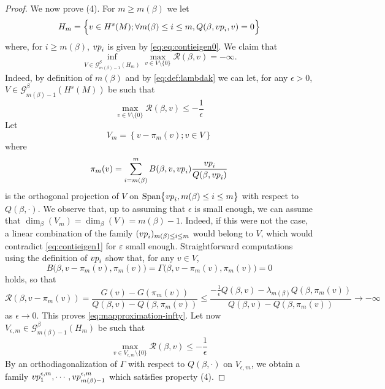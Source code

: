 \documentclass[10pt,a4paper]{amsart}
\def\ep{{\varepsilon}}
\newcommand{\vp}{{\rm vp}}
\begin{document}
\begin{proof}
We now prove (4). For $m \geq m(\beta)$ we let
$$ H_m = \Big \{ v \in H^s(M) ; \forall m(\beta)\leq i \leq m,  Q(\beta,\vp_i,v) = 0  \Big \} $$
where, for $i \ge m(\beta)$, $\vp_i$ is given by \eqref{eq:eq:contieigen0}. We claim that
\begin{equation} \label{eq:mapproximation-infty} \inf_{V \in \mathcal{G}^\beta_{m(\beta)-1}(H_m)} \max_{v\in V\setminus \{0\}} \mathcal{R}(\beta,v) = -\infty .\end{equation}
Indeed, by definition of $m(\beta)$ and by \eqref{eq:def:lambdak} we can let, for any $\epsilon >0$, $V \in \mathcal{G}_{m(\beta)-1}^\beta(H^s(M))$ be such that 
\begin{equation} \label{eq:contieigen1}
 \max_{v\in V\setminus\{0\}} \mathcal{R}(\beta,v) \leq -\frac{1}{\epsilon} 
 \end{equation}
Let
$$ V_m = \left\{ v - \pi_m(v) ; v\in V \right\} $$
where
$$\pi_m(v) = \sum_{i=m(\beta)}^m B(\beta,v,\vp_i) \frac{\vp_i}{Q(\beta,\vp_i)} $$
is the orthogonal projection of $V$ on $ \text{Span} \big \{ \vp_i, m(\beta)\leq i \leq m \big \} $ with respect to $Q(\beta,\cdot)$. We observe that, up to assuming that $\epsilon$ is small enough, we can assume that  $\dim_\beta(V_m) = \dim_\beta(V) = m(\beta)-1$. Indeed, if this were not the case, a linear combination of the family $(\vp_i)_{m(\beta)\leq i \leq m}$ would belong to $V$, which would contradict \eqref{eq:contieigen1} for $\ep$ small enough. Straightforward computations using the definition of $\vp_i$ show that, for any $v \in V$,
$$ B \big( \beta, v- \pi_m(v), \pi_m(v) \big) = \Gamma \big( \beta, v - \pi_m(v), \pi_m(v) \big) = 0$$
holds, so that 
$$ \mathcal{R}(\beta, v - \pi_m(v) ) = \frac{G(v) - G(\pi_m(v)) }{Q(\beta,v) - Q(\beta,\pi_m(v))} \leq \frac{-\frac{1}{\epsilon} Q(\beta,v) - \lambda_{m(\beta)} Q(\beta,\pi_m(v))}{Q(\beta,v)-Q(\beta,\pi_m(v))} \to -\infty$$
as $\epsilon \to 0$. This proves \eqref{eq:mapproximation-infty}. Let now $V_{\epsilon,m} \in \mathcal{G}^\beta_{m(\beta)-1}(H_m)$ be such that 
$$ \max_{v\in V_{\epsilon,m}\setminus \{0\}} \mathcal{R}(\beta,v) \leq - \frac{1}{\epsilon} $$
By an orthodiagonalization of $\Gamma$ with respect to $Q(\beta,\cdot)$ on $V_{\epsilon,m}$, we obtain a family $\vp_1^{\epsilon,m},\cdots,\vp_{m(\beta)-1}^{\epsilon,m}$ which satisfies property (4).

\smallskip 


\end{proof}
\end{document}
